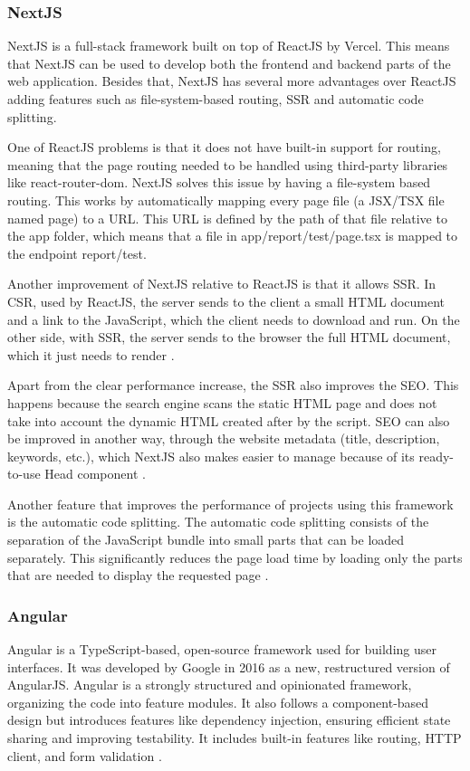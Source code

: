 \subsubsection{NextJS}
NextJS is a full-stack framework built on top of ReactJS by Vercel. This means
that NextJS can be used to develop both the frontend and backend parts of the
web application. Besides that, NextJS has several more advantages over ReactJS
adding features such as file-system-based routing, \gls{SSR}
and automatic code splitting.

One of ReactJS problems is that it does not have built-in support for routing,
meaning that the page routing needed to be handled using third-party libraries
like react-router-dom. NextJS solves this issue by having a file-system based
routing. This works by automatically mapping every page file (a \gls{JSX}/\gls{TSX}
file named page) to a \gls{URL}. This \gls{URL} is defined by the path of that file
relative to the app folder, which means that a file in app/report/test/page.tsx
is mapped to the endpoint report/test.

Another improvement of NextJS relative to ReactJS is that it allows \gls{SSR}. In
\gls{CSR}, used by ReactJS, the server sends to the client a small
\gls{HTML} document and a link to the JavaScript, which the client needs to download
and run. On the other side, with \gls{SSR}, the server sends to the browser the
full \gls{HTML} document, which it just needs to render \cite{Salanke_A.R_G.S_Dalali_2022}.

Apart from the clear performance increase, the \gls{SSR} also improves the \gls{SEO}.
This happens because the search engine scans the static
\gls{HTML} page and does not take into account the dynamic \gls{HTML} created after by
the script. \gls{SEO} can also be improved in another way, through the website
metadata (title, description, keywords, etc.), which NextJS also makes easier to
manage because of its ready-to-use Head component \cite{NextjsSSR}.

Another feature that improves the performance of projects using this framework
is the automatic code splitting. The automatic code splitting consists of
the separation of the JavaScript bundle into small parts that can be loaded
separately. This significantly reduces the page load time by loading only the
parts that are needed to display the requested page \cite{Salanke_A.R_G.S_Dalali_2022}.

\subsubsection{Angular}
Angular is a TypeScript-based, open-source framework used for building user
interfaces. It was developed by Google in 2016 as a new, restructured version
of AngularJS. Angular is a strongly structured and opinionated framework,
organizing the code into feature modules. It also follows a component-based
design but introduces features like dependency injection, ensuring efficient
state sharing and improving testability.
It includes built-in features like routing, \gls{HTTP} client, and form validation \cite{Alves}.

